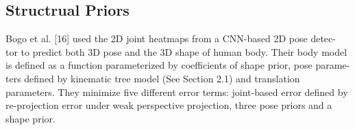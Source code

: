 \subsection{Structrual Priors}

\parencite{bogo2016keep}
Bogo et al. [16] used the 2D joint heatmaps from a CNN-based 2D pose detec-
tor to predict both 3D pose and the 3D shape of human body. Their body model
is defined as a function parameterized by coefficients of shape prior, pose parame-
ters defined by kinematic tree model (See Section 2.1) and translation parameters.
They minimize five different error terms: joint-based error defined by re-projection
error under weak perspective projection, three pose priors and a shape prior. 
